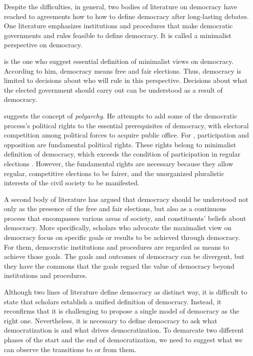 \documentclass[11pt]{article}
\begin{document}
Despite the difficulties, in general, two bodies of literature on
democracy have reached to agreements how to how to define democracy after long-lasting debates. One literature emphasizes institutions and procedures that make democratic governments and rules feasible to define democracy. It is called a minimalist perspective on democracy. 

\citet{Schumpeter1954} is the one who suggest essential definition of minimalist views on democracy. According to him, democracy means free and fair elections. Thus, democracy is limited to decisions about who will rule in this perspective. Decisions about what the elected government should carry out can be understood as a result of democracy.

\citet{Dahl1971} suggests the concept of \emph{polyarchy}. He attempts to add some of the democratic process's political rights to the essential prerequisites of democracy, with electoral competition among political forces to acquire public office. For \citet{Dahl1971}, participation and opposition are fundamental political rights. These rights belong to minimalist definition of democracy, which exceeds the condition of participation in regular elections \citep{przeworski2000}. However, the fundamental rights are necessary because they allow regular, competitive elections to be fairer, and the unorganized
pluralistic interests of the civil society to be manifested.

A second body of literature has argued that democracy should be
understood not only as the presence of the free and fair elections, but also as a continuous process that encompasses various areas of society, and constituents' beliefs about democracy. More specifically, scholars who advocate the maximalist view on democracy focus on specific goals or results to be achieved through democracy. For them, democratic institutions and procedures are regarded as means to achieve those goals. The goals and outcomes of democracy can be divergent, but they have the commons that the goals regard the value of democracy beyond institutions and procedures.

Although two lines of literature define democracy as distinct way, it is difficult to state that scholars establish a unified definition of democracy. Instead, it reconfirms that it is challenging to propose a single model of democracy as the right one. Nevertheless, it is necessary to define democracy to ask what democratization is and what drives democratization. To demarcate two different phases of the start and the end of democratization, we need to suggest what we can observe the transitions to or from them.
\end{document}
